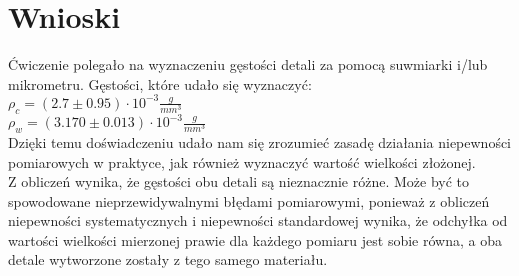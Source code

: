 {\section{Wnioski}}

Ćwiczenie polegało na wyznaczeniu gęstości detali za pomocą suwmiarki i/lub mikrometru.
Gęstości, które udało się wyznaczyć: \\

{\indent $\rho_c = (2.7 \pm 0.95) \cdot 10^{-3} \frac{g}{mm^3}$} \\

{\indent $\rho_w = (3.170 \pm 0.013) \cdot 10^{-3} \frac{g}{mm^3}$} \\

Dzięki temu doświadczeniu udało nam się zrozumieć zasadę działania niepewności pomiarowych w praktyce,
jak również wyznaczyć wartość wielkości złożonej. \\

Z obliczeń wynika, że gęstości obu detali są nieznacznie różne.
Może być to spowodowane nieprzewidywalnymi błędami pomiarowymi,
ponieważ z obliczeń niepewności systematycznych i niepewności standardowej wynika, że odchyłka od wartości wielkości mierzonej prawie dla każdego pomiaru jest sobie równa,
a oba detale wytworzone zostały z tego samego materiału.

